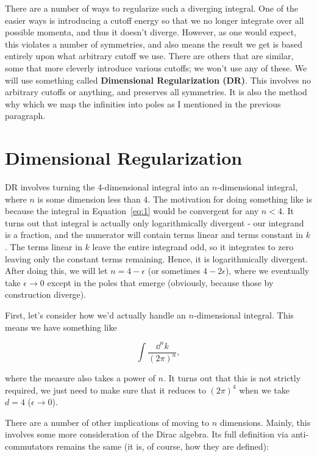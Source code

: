 \documentclass[titlepage]{article}
\begin{document}
There are a number of ways to regularize such a diverging integral. One of the easier ways is introducing a cutoff energy so that we no longer integrate over all possible momenta, and thus it doesn't diverge. However, as one would expect, this violates a number of symmetries, and also means the result we get is based entirely upon what arbitrary cutoff we use. There are others that are similar, some that more cleverly introduce various cutoffs; we won't use any of these. We will use something called \textbf{Dimensional Regularization (DR)}. This involves no arbitrary cutoffs or anything, and preserves all symmetries. It is also the method why which we map the infinities into poles as I mentioned in the previous paragraph.


\section{Dimensional Regularization}

DR involves turning the 4-dimensional integral into an $n$-dimensional integral, where $n$ is some dimension less than $4$. The motivation for doing something like is because the integral in Equation~\eqref{eq:1} would be convergent for any $n<4$. It turns out that integral is actually only logarithmically divergent - our integrand is a fraction, and the numerator will contain terms linear and terms constant in $k$. The terms linear in $k$ leave the entire integrand odd, so it integrates to zero leaving only the constant terms remaining. Hence, it is logarithmically divergent. After doing this, we will let $n=4-\epsilon$ (or sometimes $4-2\epsilon$), where we eventually take $\epsilon \rightarrow 0$ except in the poles that emerge (obviously, because those by construction diverge).

First, let's consider how we'd actually handle an $n$-dimensional integral. This means we have something like

\begin{equation}
  \int \frac{\dd^nk}{(2\pi)^n},
\end{equation}

where the measure also takes a power of $n$. It turns out that this is not strictly required, we just need to make sure that it reduces to $(2\pi)^4$ when we take $d=4$ ($\epsilon \rightarrow 0$).

There are a number of other implications of moving to $n$ dimensions. Mainly, this involves some more consideration of the Dirac algebra. Its full definition via anti-commutators remains the same (it is, of course, how they are defined):
\end{document}
